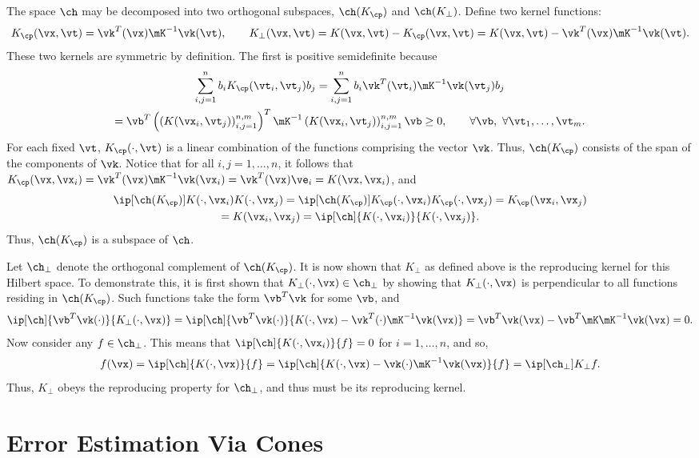 \documentclass[11pt]{amsart}
\theoremstyle{definition}
\begin{document}
The space $\ch$ may be decomposed into two orthogonal subspaces, $\ch(K_{\cp})$ and $\ch(K_{\perp})$.  Define two kernel functions:
\[
K_{\cp}(\vx,\vt) = \vk^T(\vx) \mK^{-1} \vk(\vt), \qquad K_{\perp}(\vx,\vt) = K(\vx,\vt) - K_{\cp}(\vx,\vt) = K(\vx,\vt) - \vk^T(\vx) \mK^{-1} \vk(\vt).
\]
These two kernels are symmetric by definition.  The first is positive semidefinite because
\begin{multline*}
\sum_{i,j=1}^n b_i K_{\cp}(\vt_i,\vt_j) b_j = \sum_{i,j=1}^n b_i \vk^T(\vt_i) \mK^{-1} \vk(\vt_j) b_j \\
= \vb^T \left(\left( K(\vx_i,\vt_j) \right)_{i,j=1}^{n,m} \right)^T\mK^{-1} \left( K(\vx_i,\vt_j) \right)_{i,j=1}^{n,m}\vb \ge 0, \qquad \forall \vb, \ \forall \vt_1, \ldots, \vt_m.
\end{multline*}
For each fixed $\vt$, $K_{\cp}(\cdot,\vt)$ is a linear combination of the functions comprising the vector $\vk$.  Thus, $\ch(K_{\cp})$ consists of the span of the components of $\vk$.  Notice that for all $i,j=1, \ldots, n$, it follows that $K_{\cp}(\vx,\vx_i) = \vk^T(\vx) \mK^{-1} \vk(\vx_i)  = \vk^T(\vx) \ve_i = K(\vx,\vx_i)$, and
\begin{multline*}
\ip[\ch(K_{\cp})]{K(\cdot,\vx_i)}{K(\cdot,\vx_j)} = \ip[\ch(K_{\cp})]{K_{\cp}(\cdot,\vx_i)}{K_{\cp}(\cdot,\vx_j)} = K_{\cp}(\vx_i,\vx_j) \\
= K(\vx_i,\vx_j) = \ip[\ch]{K(\cdot,\vx_i)}{K(\cdot,\vx_j)}.
\end{multline*}
Thus, $\ch(K_{\cp})$ is a subspace of $\ch$.

Let $\ch_{\perp}$ denote the orthogonal complement of $\ch(K_{\cp})$.  It is now shown that $K_{\perp}$ as defined above is the reproducing kernel for this Hilbert space.  To demonstrate this, it is first shown that $K_{\perp}(\cdot,\vx) \in \ch_{\perp}$ by showing that $K_{\perp}(\cdot,\vx)$ is  perpendicular to all functions residing in $\ch(K_{\cp})$.  Such functions take the form  $\vb^T\vk$ for some $\vb$, and
\[
\ip[\ch]{\vb^T\vk(\cdot)}{K_{\perp}(\cdot,\vx)}=\ip[\ch]{\vb^T\vk(\cdot)}{K(\cdot,\vx) - \vk^T(\cdot) \mK^{-1} \vk(\vx)} = \vb^T \vk(\vx) - \vb^T \mK \mK^{-1} \vk(\vx) = 0.
\]
Now consider any $f \in \ch_{\perp}$.  This means that $\ip[\ch]{K(\cdot,\vx_i)}{f}=0$ for $i=1, \ldots, n$, and so,
\[
f(\vx) = \ip[\ch]{K(\cdot,\vx)}{f} = \ip[\ch]{K(\cdot,\vx) - \vk(\cdot)\mK^{-1}\vk(\vx)}{f} = \ip[\ch_{\perp}]{K_{\perp}}{f}.
\]
Thus, $K_{\perp}$ obeys the reproducing property for $\ch_{\perp}$, and thus must be its reproducing kernel.


\section{Error Estimation Via Cones}
\end{document}
